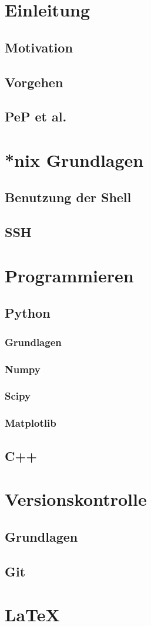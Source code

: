 \documentclass[a4paper,11pt,oneside]{scrbook}
\begin{document}
\mytitle{\today}
\newpage
\tableofcontents

\chapter{Einleitung}
\section{Motivation}
\section{Vorgehen}
\section{PeP et al.}


\chapter{*nix Grundlagen}
\section{Benutzung der Shell}
\section{SSH}


\chapter{Programmieren}
\section{Python}
\subsection{Grundlagen}
\subsection{Numpy}
\subsection{Scipy}
\subsection{Matplotlib}
\section{C++}


\chapter{Versionskontrolle}
\section{Grundlagen}
\section{Git}


\chapter{LaTeX}
\end{document}
